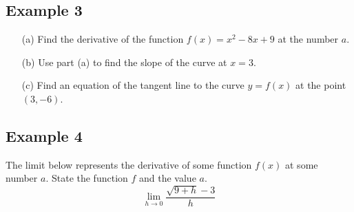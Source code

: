 \documentclass[10pt]{book}
\theoremstyle{definition}
\begin{document}
\subsection*{Example 3}
\begin{itemize}
    \item[(a)] Find the derivative of the function $f(x)=x^2-8x+9$ at the number $a$.
    \item[(b)] Use part (a) to find the slope of the curve at $x=3$.
    \item[(c)] Find an equation of the tangent line to the curve $y=f(x)$ at the point $(3,-6)$.
\end{itemize}
\vspace{8cm}
\subsection*{Example 4}
The limit below represents the derivative of some function $f(x)$ at some number $a$. State the function $f$ and the value $a$.
\[
\lim_{h\rightarrow 0}\frac{\sqrt{9+h}-3}{h}
\]
\end{document}
